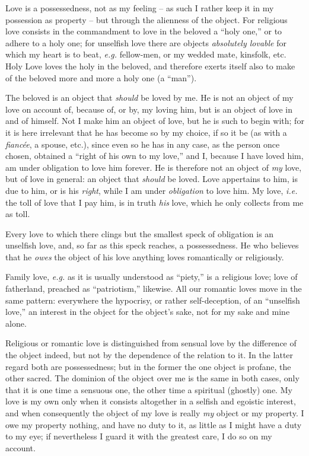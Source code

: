 \documentclass[12pt,a4paper]{book}
\begin{document}
Love is a possessedness, not as my feeling -- as such I rather keep it in my 
possession as property -- but through the alienness of the object. For 
religious love consists in the commandment to love in the beloved a ``holy 
one,'' or to adhere to a holy one; for unselfish love there are objects 
\textit{absolutely lovable} for which my heart is to beat, \textit{e.g.} 
fellow-men, or my wedded mate, kinsfolk, etc. Holy Love loves the holy in the 
beloved, and therefore exerts itself also to make of the beloved more and more 
a holy one (a ``man'').

The beloved is an object that \textit{should} be loved by me. He is not an 
object of my love on account of, because of, or by, my loving him, but is an 
object of love in and of himself. Not I make him an object of love, but he is 
such to begin with; for it is here irrelevant that he has become so by my 
choice, if so it be (as with a \textit{fianc\'ee}, a spouse, etc.), since even 
so he has in any case, as the person once chosen, obtained a ``right of his 
own to my love,'' and I, because I have loved him, am under obligation to 
love him forever. He is therefore not an object of \textit{my} love, but of 
love in general: an object that \textit{should} be loved. Love appertains to 
him, is due to him, or is his \textit{right}, while I am under 
\textit{obligation} to love him. My love, \textit{i.e.} the toll of love that 
I pay him, is in truth \textit{his} love, which he only collects from me as 
toll.

Every love to which there clings but the smallest speck of obligation is an 
unselfish love, and, so far as this speck reaches, a possessedness. He who 
believes that he \textit{owes} the object of his love anything loves 
romantically or religiously.

Family love, \textit{e.g.} as it is usually understood as ``piety,'' is a 
religious love; love of fatherland, preached as ``patriotism,'' likewise. 
All our romantic loves move in the same pattern: everywhere the hypocrisy, or 
rather self-deception, of an ``unselfish love,'' an interest in the object 
for the object's sake, not for my sake and mine alone.

Religious or romantic love is distinguished from sensual love by the 
difference of the object indeed, but not by the dependence of the relation to 
it. In the latter regard both are possessedness; but in the former the one 
object is profane, the other sacred. The dominion of the object over me is the 
same in both cases, only that it is one time a sensuous one, the other time a 
spiritual (ghostly) one. My love is my own only when it consists altogether in 
a selfish and egoistic interest, and when consequently the object of my love 
is really \textit{my} object or my property. I owe my property nothing, and 
have no duty to it, as little as I might have a duty to my eye; if 
nevertheless I guard it with the greatest care, I do so on my account.
\end{document}
